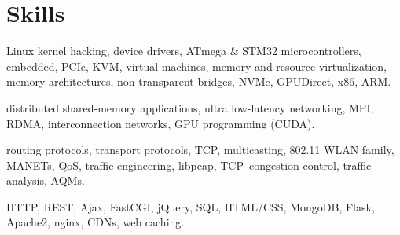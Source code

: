 \section{Skills}

{Linux kernel hacking, device drivers, ATmega \& STM32 microcontrollers, embedded,
PCIe, KVM, virtual machines, memory and resource virtualization,
memory architectures, non-transparent bridges, NVMe, GPUDirect,  x86, ARM.}

{distributed shared-memory applications, ultra low-latency networking, MPI, RDMA, interconnection networks, GPU programming (CUDA).}

{routing protocols, transport protocols, TCP, multicasting, 802.11 WLAN family, MANETs, QoS, 
traffic engineering, libpcap, TCP~congestion control, traffic analysis, AQMs.}

{HTTP, REST, Ajax, FastCGI, jQuery, SQL, HTML/CSS, MongoDB, Flask, Apache2, nginx, CDNs, web caching.}
